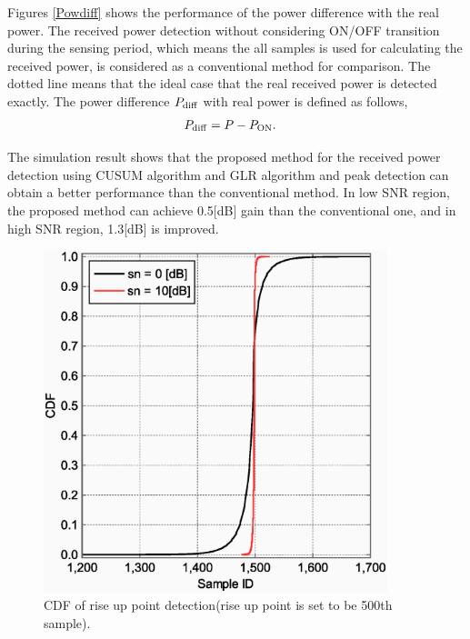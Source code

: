 Figures \ref{Powdiff} shows the performance of the power difference with the real power. 
The received power detection without considering ON/OFF transition during the sensing period, which means the all samples is used for calculating the received power, is considered as a conventional method for comparison. The dotted line means that the ideal case that the real received power is detected exactly. The power difference $P_{\rm diff}$ with real power is defined as follows,
\begin{eqnarray}
P_{{\rm diff}} &= P-P_{{\rm ON}}.
\label{diff}
\end{eqnarray}

The simulation result shows that the proposed method for the received power detection using CUSUM algorithm and GLR algorithm and peak detection can obtain a better performance than the conventional method. In low SNR region, the proposed method can achieve 0.5[dB] gain than the conventional one, and in high SNR region, 1.3[dB] is improved.

\begin{figure}[!htp]
\centering
\includegraphics[width=100mm]{cdf_OFF2ON.eps}
\caption{CDF of rise up point detection(rise up point is set to be 500th sample).}
\label{cdf_off2on}
\end{figure}


